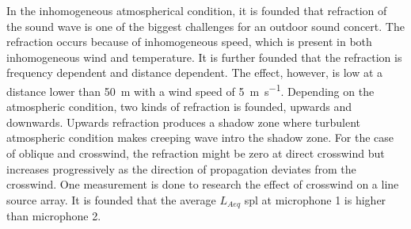 In the inhomogeneous atmospherical condition, it is founded that refraction of the sound wave is one of the biggest challenges for an outdoor sound concert. The refraction occurs because of inhomogeneous speed, which is present in both inhomogeneous wind and temperature. It is further founded that the refraction is frequency dependent and distance dependent. The effect, however, is low at a distance lower than \SI{50}{\meter} with a wind speed of \SI{5}{\meter\per\second}. Depending on the atmospheric condition, two kinds of refraction is founded, upwards and downwards. Upwards refraction produces a shadow zone where turbulent atmospheric condition makes creeping wave intro the shadow zone. For the case of oblique and crosswind, the refraction might be zero at direct crosswind but increases progressively as the direction of propagation deviates from the crosswind. One measurement is done to research the effect of crosswind on a line source array. It is founded that the average $L_{Aeq}$ \gls{spl} at microphone 1 is  higher than microphone 2. 

